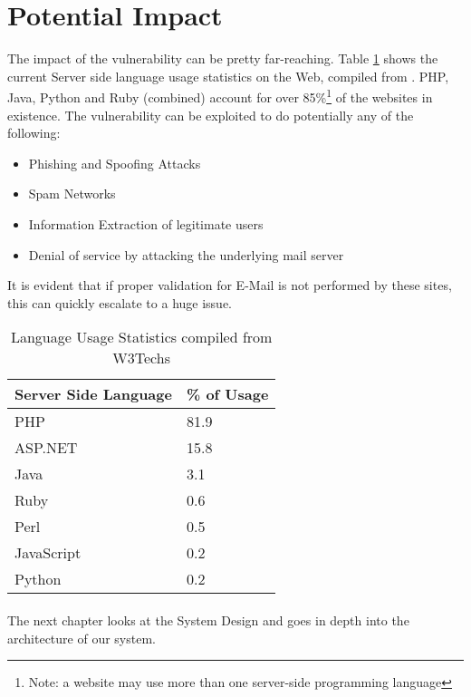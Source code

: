 \section{Potential Impact}

The impact of the vulnerability can be pretty far-reaching.
Table \ref{tab:usage} shows the current Server side language usage statistics on the Web, compiled from \cite{W3techs}. 
PHP, Java, Python and Ruby (combined) account for over 85\%\footnote{Note: a website may use more than one server-side programming language} of the websites in existence. The vulnerability can be exploited to do potentially any of the following:
\begin{itemize}
	\item Phishing and Spoofing Attacks
	\item Spam Networks
	\item Information Extraction of legitimate users
	\item Denial of service by attacking the underlying mail server
\end{itemize}

It is evident that if proper validation for E-Mail is not performed by these sites, this can quickly escalate to a huge issue.


\begin{table}[!htbp]
	\centering
	\begin{tabular}{|p{4cm}|p{4cm}|}
		\hline
		\multicolumn{1}{|c|}{\textbf{Server Side Language}} & \multicolumn{1}{c|}{\textbf{\% of Usage}}\\
		\hline
		PHP & 81.9\\
		\hline    
		ASP.NET    & 15.8\\
		\hline
		Java & 3.1\\
		\hline
		Ruby &     0.6\\
		\hline
		Perl &    0.5\\
		\hline
		JavaScript & 0.2\\
		\hline
		Python & 0.2\\
		\hline
		
	\end{tabular}
	\caption{Language Usage Statistics compiled from W3Techs}
	\label{tab:usage}
\end{table}

\paragraph{}
The next chapter looks at the System Design and goes in depth into the architecture of our system.

